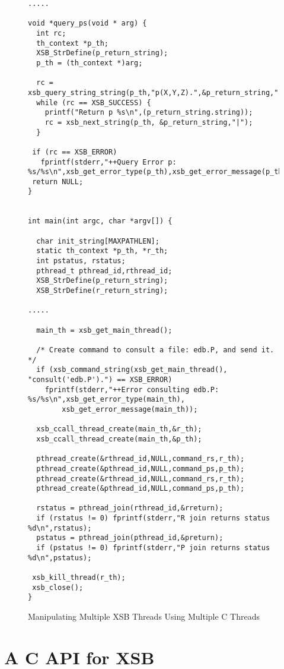 \begin{figure}[hbtp]
\begin{small}
\begin{verbatim}
.....

void *query_ps(void * arg) {
  int rc;
  th_context *p_th;
  XSB_StrDefine(p_return_string);
  p_th = (th_context *)arg;
  
  rc = xsb_query_string_string(p_th,"p(X,Y,Z).",&p_return_string,"|");
  while (rc == XSB_SUCCESS) {
    printf("Return p %s\n",(p_return_string.string));
    rc = xsb_next_string(p_th, &p_return_string,"|");
  }

 if (rc == XSB_ERROR) 
   fprintf(stderr,"++Query Error p: %s/%s\n",xsb_get_error_type(p_th),xsb_get_error_message(p_th));
 return NULL;
}


int main(int argc, char *argv[]) { 

  char init_string[MAXPATHLEN];
  static th_context *p_th, *r_th;
  int pstatus, rstatus;
  pthread_t pthread_id,rthread_id;
  XSB_StrDefine(p_return_string);
  XSB_StrDefine(r_return_string);

.....

  main_th = xsb_get_main_thread();

  /* Create command to consult a file: edb.P, and send it. */
  if (xsb_command_string(xsb_get_main_thread(), "consult('edb.P').") == XSB_ERROR)
    fprintf(stderr,"++Error consulting edb.P: %s/%s\n",xsb_get_error_type(main_th),
	    xsb_get_error_message(main_th));

  xsb_ccall_thread_create(main_th,&r_th);
  xsb_ccall_thread_create(main_th,&p_th);

  pthread_create(&rthread_id,NULL,command_rs,r_th);
  pthread_create(&pthread_id,NULL,command_ps,p_th);
  pthread_create(&rthread_id,NULL,command_rs,r_th);
  pthread_create(&pthread_id,NULL,command_ps,p_th);

  rstatus = pthread_join(rthread_id,&rreturn);
  if (rstatus != 0) fprintf(stderr,"R join returns status %d\n",rstatus);
  pstatus = pthread_join(pthread_id,&preturn);
  if (pstatus != 0) fprintf(stderr,"P join returns status %d\n",pstatus);

 xsb_kill_thread(r_th);
 xsb_close();      
}
\end{verbatim}
\end{small}
\caption{Manipulating Multiple XSB Threads Using Multiple C Threads} 
\label{fig:varstringex3}
\end{figure}

\section{A C API for XSB} \label{sec:CAPI}
%
